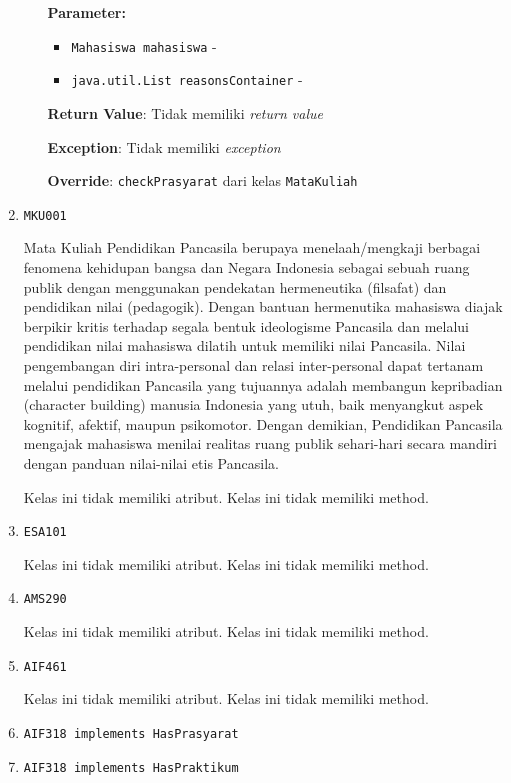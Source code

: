 \documentclass{article}
\begin{document}
\begin{enumerate}
\begin{itemize}
\textbf{Parameter:}
\begin{itemize}
\item \texttt{Mahasiswa mahasiswa} - 
\item \texttt{java.util.List reasonsContainer} - 
\end{itemize}
\textbf{Return Value}: Tidak memiliki \textit{return value}

\textbf{Exception}: Tidak memiliki \textit{exception}

\textbf{Override}: \texttt{checkPrasyarat} dari kelas \texttt{MataKuliah}

\end{itemize}
\item \texttt{MKU001}

Mata Kuliah Pendidikan Pancasila berupaya menelaah/mengkaji berbagai fenomena kehidupan 
 bangsa dan Negara Indonesia sebagai sebuah ruang publik dengan menggunakan pendekatan 
 hermeneutika (filsafat) dan pendidikan nilai (pedagogik). Dengan bantuan hermenutika
 mahasiswa diajak berpikir kritis terhadap segala bentuk ideologisme Pancasila dan melalui 
 pendidikan nilai mahasiswa dilatih untuk memiliki nilai Pancasila. Nilai pengembangan diri 
 intra-personal dan relasi inter-personal dapat tertanam melalui pendidikan Pancasila yang 
 tujuannya adalah membangun kepribadian (character building) manusia Indonesia yang utuh, 
 baik menyangkut aspek kognitif, afektif, maupun psikomotor. Dengan demikian, Pendidikan 
 Pancasila mengajak mahasiswa menilai realitas ruang publik sehari-hari secara mandiri 
 dengan panduan nilai-nilai etis Pancasila.

Kelas ini tidak memiliki atribut. Kelas ini tidak memiliki method. \item \texttt{ESA101}



Kelas ini tidak memiliki atribut. Kelas ini tidak memiliki method. \item \texttt{AMS290}



Kelas ini tidak memiliki atribut. Kelas ini tidak memiliki method. \item \texttt{AIF461}



Kelas ini tidak memiliki atribut. Kelas ini tidak memiliki method. \item \texttt{AIF318 implements HasPrasyarat}

\item \texttt{AIF318 implements HasPraktikum}


\end{enumerate}
\end{document}
